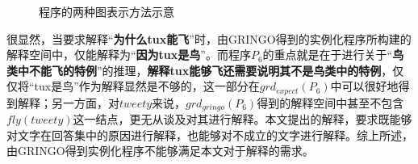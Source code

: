     \begin{figure}[htbp] 
        \centering 
        \quad\quad
        \caption{程序的两种图表示方法示意} 
        \label{fig:3_9} 
    \end{figure}

    很显然，当要求解释“\textbf{为什么tux能飞}”时，由\textsf{GRINGO}得到的实例化程序所构建的解释空间中，仅能解释为“\textbf{因为tux是鸟}”。而程序$P_6$的重点就是在于进行关于“\textbf{鸟类中不能飞的特例}”的推理，\textbf{解释tux能够飞还需要说明其不是鸟类中的特例}，仅仅将“tux是鸟”作为解释显然是不够的，这一部分在$grd_{expect}(P_6)$中可以很好地得到解释；另一方面，对$tweety$来说，$grd_{gringo}(P_6)$得到的解释空间中甚至不包含$fly(tweety)$这一结点，更无从谈及对其进行解释。本文提出的解释，要求既能够对文字在回答集中的原因进行解释，也能够对不成立的文字进行解释。综上所述，由\textsf{GRINGO}得到实例化程序不能够满足本文对于解释的需求。

